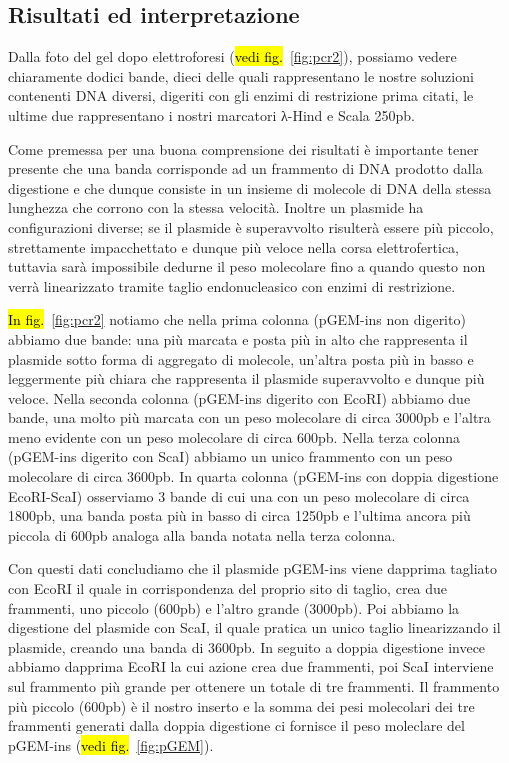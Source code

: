 \documentclass[twocolumn,a4paper,10pt]{my_report}
\begin{document}
\subsection{Risultati ed interpretazione}
Dalla foto del gel dopo elettroforesi (\hl{vedi fig.}~\ref{fig:pcr2}), possiamo vedere chiaramente dodici bande, dieci delle quali rappresentano le nostre soluzioni contenenti DNA diversi, digeriti con gli enzimi di restrizione prima citati, le ultime due rappresentano i nostri marcatori λ-Hind e Scala 250pb.

Come premessa per una buona comprensione dei risultati è importante tener presente che una banda corrisponde ad un frammento di DNA prodotto dalla digestione e che dunque consiste in un insieme di molecole di DNA della stessa lunghezza che corrono con la stessa velocità.
Inoltre un plasmide ha configurazioni diverse; se il plasmide è superavvolto risulterà essere più piccolo, strettamente impacchettato e dunque più veloce nella corsa elettrofertica, tuttavia sarà impossibile dedurne il peso molecolare fino a quando questo non verrà linearizzato tramite taglio endonucleasico con enzimi di restrizione.

\hl{In fig.}~\ref{fig:pcr2} notiamo che nella prima colonna (pGEM-ins non digerito) abbiamo due bande: una più marcata e posta più in alto che rappresenta il plasmide sotto forma di aggregato di molecole, un’altra posta più in basso e leggermente più chiara che rappresenta il plasmide superavvolto e dunque più veloce.
Nella seconda colonna (pGEM-ins digerito con EcoRI) abbiamo due bande, una molto più marcata con un peso molecolare di circa 3000pb e l’altra meno evidente con un peso molecolare di circa 600pb.
Nella terza colonna (pGEM-ins digerito con ScaI) abbiamo un unico frammento con un peso molecolare di circa 3600pb.
In quarta colonna (pGEM-ins con doppia digestione EcoRI-ScaI) osserviamo 3 bande di cui una con un peso molecolare di circa 1800pb, una banda posta più in basso di circa 1250pb e l’ultima ancora più piccola di 600pb analoga alla banda notata nella terza colonna.

Con questi dati concludiamo che il plasmide pGEM-ins viene dapprima tagliato con EcoRI il quale in corrispondenza del proprio sito di taglio, crea due frammenti, uno piccolo (600pb) e l’altro grande (3000pb).
Poi abbiamo la digestione del plasmide con ScaI, il quale pratica un unico taglio linearizzando il plasmide, creando una banda di 3600pb.
In seguito a doppia digestione invece abbiamo dapprima EcoRI la cui azione crea due frammenti, poi ScaI interviene sul frammento più grande per ottenere un totale di tre frammenti.
Il frammento più piccolo (600pb) è il nostro inserto e la somma dei pesi molecolari dei tre frammenti generati dalla doppia digestione ci fornisce il peso moleclare del pGEM-ins (\hl{vedi fig.}~\ref{fig:pGEM}).
\end{document}
